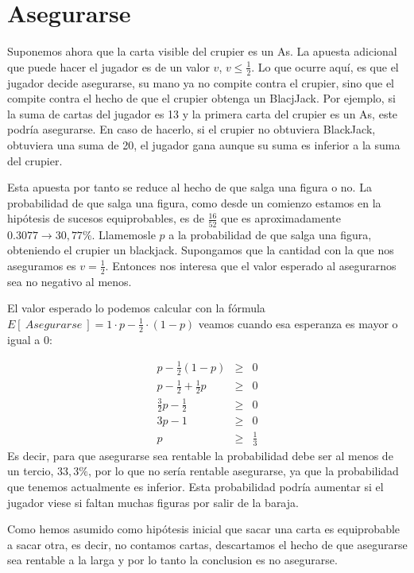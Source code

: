 \documentclass[12pt,a4paper,]{book}
\numberwithin{dummy}{section}
\theoremstyle{ocrenumbox}
\theoremstyle{blacknumex}
\theoremstyle{blacknumbox}
\theoremstyle{ocrenum}
\theoremstyle{ocrenum}
\begin{document}
\hypertarget{Seccion45}{%
\section{Asegurarse}\label{Seccion45}}

Suponemos ahora que la carta visible del crupier es un As. La apuesta
adicional que puede hacer el jugador es de un valor \(v\),
\(v \leq \frac{1}{2}\). Lo que ocurre aquí, es que el jugador decide
asegurarse, su mano ya no compite contra el crupier, sino que el compite
contra el hecho de que el crupier obtenga un BlacjJack. Por ejemplo, si
la suma de cartas del jugador es 13 y la primera carta del crupier es un
As, este podría asegurarse. En caso de hacerlo, si el crupier no
obtuviera BlackJack, obtuviera una suma de 20, el jugador gana aunque su
suma es inferior a la suma del crupier.

Esta apuesta por tanto se reduce al hecho de que salga una figura o no.
La probabilidad de que salga una figura, como desde un comienzo estamos
en la hipótesis de sucesos equiprobables, es de \(\frac{16}{52}\) que es
aproximadamente \(0.3077 \rightarrow 30,77 \%\). Llamemosle \(p\) a la
probabilidad de que salga una figura, obteniendo el crupier un
blackjack. Supongamos que la cantidad con la que nos aseguramos es
\(v=\frac{1}{2}\). Entonces nos interesa que el valor esperado al
asegurarnos sea no negativo al menos.

El valor esperado lo podemos calcular con la fórmula
\(E[ \ Asegurarse \ ]= 1·p - \frac{1}{2}·(1-p)\) veamos cuando esa
esperanza es mayor o igual a 0:

\[
\begin{array}{ccl}
p - \frac{1}{2}(1-p)& \geq  & 0 \\
p - \frac{1}{2} +\frac{1}{2}p& \geq  & 0\\
\frac{3}{2}p - \frac{1}{2} & \geq  & 0\\
3p - 1& \geq  & 0 \\
p & \geq & \frac{1}{3}
\end{array}
\] Es decir, para que asegurarse sea rentable la probabilidad debe ser
al menos de un tercio, \(33,3 \%\), por lo que no sería rentable
asegurarse, ya que la probabilidad que tenemos actualmente es inferior.
Esta probabilidad podría aumentar si el jugador viese si faltan muchas
figuras por salir de la baraja.

Como hemos asumido como hipótesis inicial que sacar una carta es
equiprobable a sacar otra, es decir, no contamos cartas, descartamos el
hecho de que asegurarse sea rentable a la larga y por lo tanto la
conclusion es no asegurarse.
\end{document}
